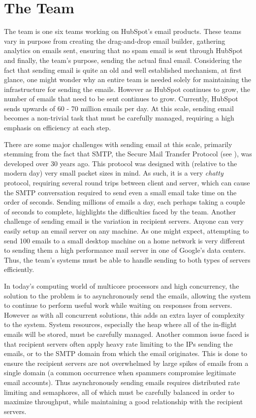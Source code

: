 \section{The \team{} Team} \label{sec:emailSendingInfra}
The \team{} team is one six teams working on HubSpot's email products. These teams vary in purpose from creating the drag-and-drop email builder, gathering analytics on emails sent, ensuring that no spam email is sent through HubSpot and finally, the \team{} team's purpose, sending the actual final email. Considering the fact that sending email is quite an old and well established mechanism, at first glance, one might wonder why an entire team is needed solely for maintaining the infrastructure for sending the emails. However as HubSpot continues to grow, the number of emails that need to be sent continues to grow. Currently, HubSpot sends upwards of 60 - 70 million emails per day. At this scale, sending email becomes a non-trivial task that must be carefully managed, requiring a high emphasis on efficiency at each step. 

There are some major challenges with sending email at this scale, primarily stemming from the fact that SMTP, the Secure Mail Transfer Protocol (see ), was developed over 30 years ago. This protocol was designed with (relative to the modern day) very small packet sizes in mind. As such, it is a very \textit{chatty} protocol, requiring several round trips between client and server, which can cause the SMTP conversation required to send even a small email take time on the order of seconds. Sending millions of emails a day, each perhaps taking a couple of seconds to complete, highlights the difficulties faced by the \team{} team. Another challenge of sending email is the variation in recipient servers. Anyone can very easily setup an email server on any machine. As one might expect, attempting to send 100 emails to a small desktop machine on a home network is very different to sending them a high performance mail server in one of Google's data centers. Thus, the \team{} team's systems must be able to handle sending to both types of servers efficiently. 

In today's computing world of multicore processors and high concurrency, the solution to the problem is to asynchronously send the emails, allowing the system to continue to perform useful work while waiting on responses from servers. However as with all concurrent solutions, this adds an extra layer of complexity to the system. System resources, especially the heap where all of the in-flight emails will be stored, must be carefully managed. Another common issue faced is that recipient servers often apply heavy rate limiting to the IPs sending the emails, or to the SMTP domain from which the email originates. This is done to ensure the recipient servers are not overwhelmed by large spikes of emails from a single domain (a common occurrence when spammers compromise legitimate email accounts). Thus asynchronously sending emails requires distributed rate limiting and semaphores, all of which must be carefully balanced in order to maximize throughput, while maintaining a good relationship with the recipient servers. 

